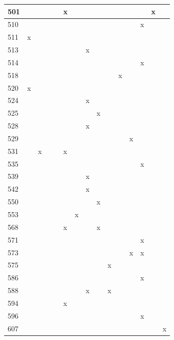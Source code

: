 \begin{landscape}
\begin{longtable}{|p{0.2in}|p{0.3in}|p{0.41in}|p{0.4in}|p{0.3in}|p{0.31in}|p{0.3in}|p{0.3in}|p{0.375in}|p{0.3in}|p{0.3in}|p{0.35in}|p{0.35in}|p{0.4in}|p{0.3in}|}
   501 &  &  &  &  & x &  &  &  &  &  &  &  & x &  \\  \hline
   510 &  &  &  &  &  &  &  &   &   &   &  & x &  &   \\  \hline
   511 & x &  &  &  &  &  &  &  &  &  &  &  &  &  \\  \hline
   513 &  &  &  &  &  &  & x &  &  &  &  &  &  &  \\  \hline
   514 &  &  &  &  &  &  &  &  &  &  &  & x &  &  \\  \hline
   518 &  &  &  &  &  &  &  &  &  & x &  &  &  &  \\  \hline
   520 & x &  &  &  &   &   &   &   &   &   &   &   &  &   \\  \hline
   524 &  &  &  &  &  &  & x &  &  &  &  &  &  &   \\  \hline
   525 &  &  &  &  &  &  &  & x &  &  &  &  &  &  \\  \hline
   528 &  &  &  &  &  &  & x &  &  &  &  &  &  &  \\  \hline
   529 &  &  &  &  &  &  &  &  &  &  & x &  &  &  \\  \hline
   531 &  & x &  &  & x &  &  &  &  &  &  &  &  &  \\  \hline
   535 &  &  &  &  &  &  &  &  &  &  &  & x &  &  \\  \hline
   539 &  &  &  &  &  &  & x &  &  &  &  &  &  &  \\  \hline
   542 &  &  &  &  &  &  & x &  &  &  &  &  &  &  \\  \hline
   550 &  &  &  &  &  &  &  & x &  &  &  &  &  &  \\  \hline
   553 &  &  &  &  &  & x &  &  &  &  &  &  &  &  \\  \hline
   568 &  &  &  &  & x &  &  & x &  &  &  &  &  &  \\  \hline
   571 &  &  &  &  &  &  &  &   &   &   &  & x &  &   \\  \hline
   573 &  &  &  &  &  &  &  &  &  &  & x & x &  &  \\  \hline
   575 &  &  &  &  &  &  &  &  & x &  &  &  &  &  \\  \hline
   586 &  &  &  &  &  &  &  &  &  &  &  & x &  &  \\  \hline
   588 &  &  &  &  &  &  & x &  & x &  &  &  &  &  \\  \hline
   594 &  &  &  &  & x &  &  &   &   &   &  &  &  &  \\  \hline
   596 &  &  &  &  &  &  &  &  &  &  &  & x &  &  \\  \hline
   607 &  &  &  &  &  &  &  &   &   &   &  &  &  & x \\ \hline 

\end{longtable}
\end{landscape}
